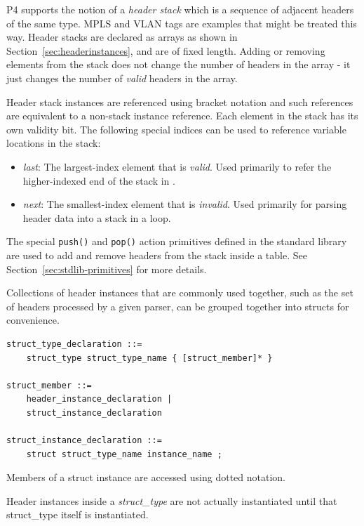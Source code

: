 \documentclass[12pt]{article}
\begin{document}

P4 supports the notion of a \textit{header stack} which is a sequence of
adjacent headers of the same type. MPLS and VLAN tags are examples that might
be treated this way.  Header stacks are declared as arrays as shown in
Section~\ref{sec:headerinstances}, and are of fixed length. Adding or removing
elements from the stack does not change the number of headers in the array - it
just changes the number of \textit{valid} headers in the array.

Header stack instances are referenced using bracket notation and such
references are equivalent to a non-stack instance reference. Each
element in the stack has its own validity bit. The following special
indices can be used to reference variable locations in the stack:
\begin{itemize}
\item
\textit{last}: The largest-index element that is \textit{valid}.
Used primarily to refer the higher-indexed end of the stack in \matchaction.
\item
\textit{next}: The smallest-index element that is \textit{invalid}.
Used primarily for parsing header data into a stack in a loop.
\end{itemize}
The special \texttt{push()} and \texttt{pop()} action primitives defined
in the standard library are used to add and remove headers from the stack
inside a \matchaction table. See Section~\ref{sec:stdlib-primitives} for more
details.


Collections of header instances that are commonly used together, such
as the set of headers processed by a given parser, can be grouped together
into structs for convenience.

\begin{lstlisting}[style=BNFstyle]
struct_type_declaration ::=
    struct_type struct_type_name { [struct_member]* }

struct_member ::=
    header_instance_declaration |
    struct_instance_declaration

struct_instance_declaration ::=
    struct struct_type_name instance_name ;
\end{lstlisting}

Members of a struct instance are accessed using dotted notation.

Header instances inside a \textit{struct_type} are not actually instantiated
until that struct_type itself is instantiated.
\end{document}
